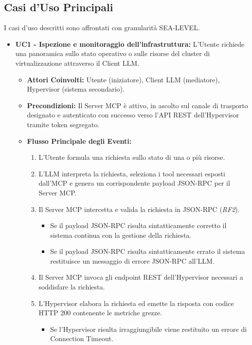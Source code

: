 \subsection{Casi d'Uso Principali}
I casi d'uso descritti sono affrontati con granularità SEA-LEVEL.
\begin{itemize}
    \item \textbf{UC1 - Ispezione e monitoraggio dell'infrastruttura:}
    L'Utente richiede una panoramica sullo stato operativo o sulle risorse del cluster di virtualizzazione attraverso il Client LLM.
    \begin{itemize}
        \item \textbf{Attori Coinvolti:} Utente (iniziatore), Client LLM (mediatore), Hypervisor (sistema secondario).
        \item \textbf{Precondizioni:} Il Server MCP è attivo, in ascolto sul canale di trasporto designato e autenticato con successo verso l'API REST dell'Hypervisor tramite token segregato.
        \item \textbf{Flusso Principale degli Eventi:}
        \begin{enumerate}
            \item L'Utente formula una richiesta sullo stato di una o più risorse.
            \item L'LLM interpreta la richiesta, seleziona i tool necessari esposti dall'MCP e genera un corrispondente payload JSON-RPC per il Server MCP.
            \item Il Server MCP intercetta e valida la richiesta in JSON-RPC (\textit{RF2}).
            \begin{itemize}
                \item Se il payload JSON-RPC risulta sintatticamente corretto il sistema continua con la gestione della richiesta.
                \item Se il payload JSON-RPC risulta sintatticamente errato il sistema restituisce un messaggio di errore JSON-RPC all'LLM.
            \end{itemize}
            \item Il Server MCP invoca gli endpoint REST dell'Hypervisor necessari a soddisfare la richiesta.
            \item L'Hypervisor elabora la richiesta ed emette la risposta con codice HTTP 200 contenente le metriche grezze.
            \begin{itemize}
                \item Se l'Hypervisor risulta irraggiungibile viene restituito un errore di Connection Timeout.

\end{itemize}
\end{enumerate}
\end{itemize}
\end{itemize}
